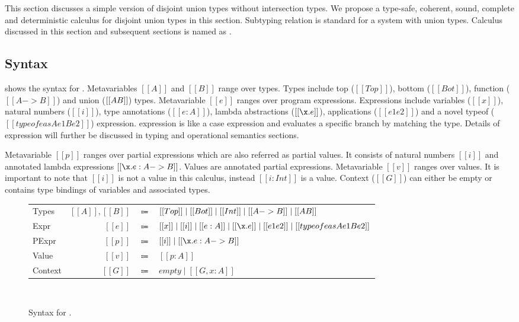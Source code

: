 \section{\dut}
\label{sec:union}

This section discusses a simple version of disjoint union types without intersection types. We propose a type-safe, coherent, sound, complete and deterministic calculus for disjoint union types in this section. Subtyping relation is standard for a system with union types. Calculus discussed in this section and subsequent sections is named as \cal.


\subsection{Syntax}
\label{sec:union:syntax}
 shows the syntax for \cal. Metavariables $[[A]]$ and $[[B]]$ range over types.
Types include top ($[[Top]]$), bottom ($[[Bot]]$), function ($[[A -> B]]$) and union ($[[A \/ B]]$) types.
Metavariable $[[e]]$ ranges over program expressions. Expressions include variables ($[[x]]$), natural numbers ($[[i]]$), type annotations ($[[e:A]]$), lambda abstractions ($[[\x.e]]$), applications ($[[e1 e2]]$) and a novel typeof ($[[typeof e as A e1 B e2]]$) expression. \Typeof expression is like a case expression and evaluates a specific branch by matching the type. Details of \typeof expression will further be discussed in typing and operational semantics sections.

Metavariable $[[p]]$ ranges over partial expressions which are also referred as partial values.
It consists of natural numbers $[[i]]$ and annotated lambda expressions $[[\x.e : A -> B]]$.
Values are annotated partial expressions. Metavariable $[[v]]$ ranges over values. It is important to
note that $[[i]]$ is not a value in this calculus, instead $[[i:Int]]$ is a value.
Context ($[[G]]$) can either be empty or contains type bindings of variables and associated types. 

\begin{figure}[t]
  \begin{small}
    \centering
    \begin{tabular}{lrcl} \toprule
      Types & $[[A]], [[B]]$ & $\Coloneqq$ & $ [[Top]] \mid [[Bot]] \mid [[Int]] \mid [[A -> B]] \mid [[A \/ B]] $ \\
      Expr & $[[e]]$ & $\Coloneqq$ & $[[x]] \mid [[i]] \mid [[e:A]] \mid [[\x.e]] \mid [[e1 e2]] \mid [[typeof e as A e1 B e2]]$\\
      PExpr & $[[p]]$ & $\Coloneqq$ & $[[i]] \mid [[\x.e : A -> B]] $\\
      Value & $[[v]]$ & $\Coloneqq$ & $[[p:A]]$\\
      Context & $[[G]]$ & $\Coloneqq$ & $ empty \mid [[G , x : A]]$ \\
      \bottomrule
    \end{tabular}
  \end{small}\\
  \caption{Syntax for \dut.}
  \label{fig:union:syntax}
\end{figure}


